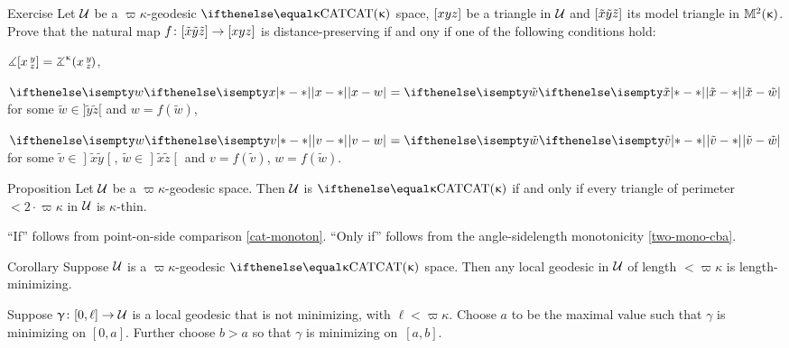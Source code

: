 \begin{thm}{Exercise}\label{ex:equality-for-thin}
Let $\mathcal{U}$ be a $\varpi\kappa$-geodesic $\CAT\kappa$ space,
$[{x}{y}{z}]$ be a triangle in $\mathcal{U}$
and $[{\tilde x}{\tilde y}{\tilde z}]$ its model triangle in $\mathbb{M}_{{}}^{2}({\upkappa})$.
Prove that the natural map $f\:\trig{\tilde x}{\tilde y}{\tilde z}\to \trig xyz$ 
 is distance-preserving if and ony if one of the following conditions hold:

\begin{subthm}{}
$\mangle\hinge x y z= \angk\kappa x y z$,
\end{subthm}

\begin{subthm}{}
$\dist{x}{w}{}=\dist{\tilde x}{\tilde w}{}$ for some  $\tilde w\in]\tilde y\tilde z[$ and
$w= f(\tilde w)$,   
\end{subthm}

\begin{subthm}{} 
$\dist{v}{w}{}=\dist{\tilde v}{\tilde w}{}$ for some  
$\tilde v\in \mathopen{]}\tilde x \tilde y\mathclose{[}$,  $\tilde w\in\mathopen{]}\tilde x \tilde z\mathclose{[}$
and $v=f(\tilde v)$, $w=f(\tilde w)$.
\end{subthm} 

\end{thm}

{\sloppy 

\begin{thm}{Proposition}\label{prop:k-thin}
Let $\mathcal{U}$ be a $\varpi\kappa$-geodesic space. 
Then $\mathcal{U}$ is  $\CAT\kappa$
if and only if every triangle of perimeter $<2\cdot \varpi\kappa$ in $\mathcal{U}$  is $\kappa$-thin.
\end{thm}

}

``If'' follows from point-on-side comparison \ref{cat-monoton}.  
``Only if'' follows from the angle-sidelength  monotonicity \ref{two-mono-cba}.
\qeds


\begin{thm}{Corollary}\label{cor:loc-geod-are-min}
Suppose $\mathcal{U}$ is a $\varpi\kappa$-geodesic $\CAT\kappa$ space.  
Then any local geodesic in $\mathcal{U}$ of length $<\varpi\kappa$ is length-minimizing.
\end{thm}

Suppose $\gamma\:[0,\ell]\to\spc{U}$ is a local geodesic  that is not minimizing, with $\ell<\varpi\kappa$.
Choose $a$ to be the maximal value 
such that $\gamma$ is minimizing on $[0,a]$.
Further choose $b>a$ so that $\gamma$ is minimizing on~$[a,b]$.

